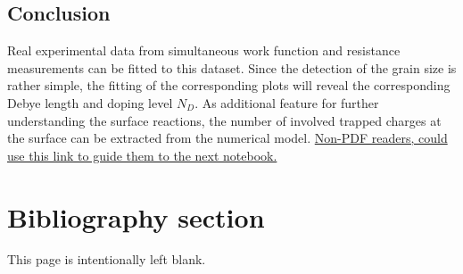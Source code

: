 \documentclass[11pt]{article}
\begin{document}
\hypertarget{conclusion}{%
\subsection{Conclusion}\label{conclusion}}

Real experimental data from simultaneous work function and resistance
measurements can be fitted to this dataset. Since the detection of the
grain size is rather simple, the fitting of the corresponding plots will
reveal the corresponding Debye length and doping level \(N_D\). As
additional feature for further understanding the surface reactions, the
number of involved trapped charges at the surface can be extracted from
the numerical model. \href{./4-Exp-data.ipynb}{Non-PDF readers, could
use this link to guide them to the next notebook.}

    \hypertarget{bibliography-section}{%
\section{Bibliography section}\label{bibliography-section}}

    


    \newpage

This page is intentionally left blank.


    
    
    
\end{document}
